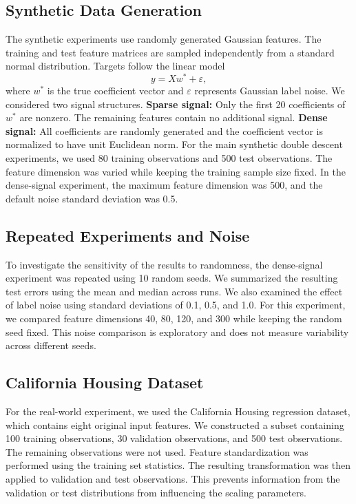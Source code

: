 \documentclass[11pt,a4paper]{article}
\begin{document}
\subsection{Synthetic Data Generation}
The synthetic experiments use randomly generated
Gaussian features. The training and test feature
matrices are sampled independently from a
standard normal distribution.
Targets follow the linear model
\begin{equation}
    y = Xw^*+\varepsilon,
\end{equation}
where $w^*$ is the true coefficient vector and
$\varepsilon$ represents Gaussian label noise.
We considered two signal structures.
\textbf{Sparse signal:}
Only the first 20 coefficients of $w^*$ are
nonzero. The remaining features contain no
additional signal.
\textbf{Dense signal:}
All coefficients are randomly generated and
the coefficient vector is normalized to have
unit Euclidean norm.
For the main synthetic double descent experiments,
we used 80 training observations and 500 test
observations.
The feature dimension was varied while keeping
the training sample size fixed.
In the dense-signal experiment, the maximum
feature dimension was 500, and the default
noise standard deviation was 0.5.

\subsection{Repeated Experiments and Noise}
To investigate the sensitivity of the results
to randomness, the dense-signal experiment
was repeated using 10 random seeds.
We summarized the resulting test errors using
the mean and median across runs.
We also examined the effect of label noise
using standard deviations of 0.1, 0.5, and 1.0.
For this experiment, we compared feature
dimensions 40, 80, 120, and 300 while keeping
the random seed fixed.
This noise comparison is exploratory and does
not measure variability across different seeds.

\subsection{California Housing Dataset}
For the real-world experiment, we used the
California Housing regression dataset,
which contains eight original input features.
We constructed a subset containing 100 training
observations, 30 validation observations, and
500 test observations.
The remaining observations were not used.
Feature standardization was performed using
the training set statistics. The resulting
transformation was then applied to validation
and test observations.
This prevents information from the validation
or test distributions from influencing the
scaling parameters.
\end{document}

